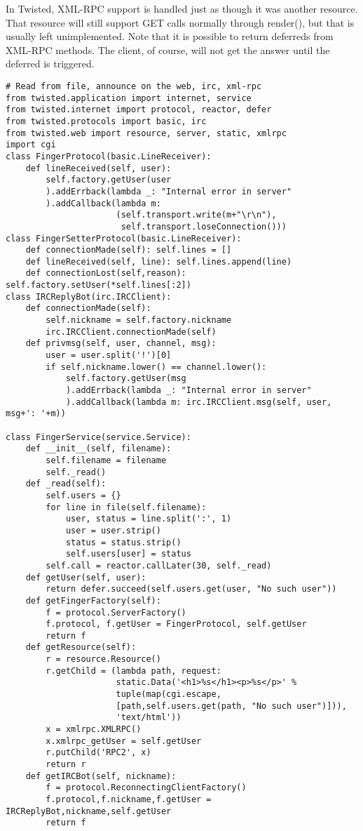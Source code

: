 In Twisted, XML-RPC support is handled just as though it was another resource. That resource will still support GET calls normally through render(), but that is usually left unimplemented. Note that it is possible to return deferreds from XML-RPC methods. The client, of course, will not get the answer until the deferred is triggered.\begin{verbatim}
# Read from file, announce on the web, irc, xml-rpc
from twisted.application import internet, service
from twisted.internet import protocol, reactor, defer
from twisted.protocols import basic, irc
from twisted.web import resource, server, static, xmlrpc
import cgi
class FingerProtocol(basic.LineReceiver):
    def lineReceived(self, user):
        self.factory.getUser(user
        ).addErrback(lambda _: "Internal error in server"
        ).addCallback(lambda m:
                      (self.transport.write(m+"\r\n"),
                       self.transport.loseConnection()))
class FingerSetterProtocol(basic.LineReceiver):
    def connectionMade(self): self.lines = []
    def lineReceived(self, line): self.lines.append(line)
    def connectionLost(self,reason): self.factory.setUser(*self.lines[:2])
class IRCReplyBot(irc.IRCClient):
    def connectionMade(self):
        self.nickname = self.factory.nickname
        irc.IRCClient.connectionMade(self)
    def privmsg(self, user, channel, msg):
        user = user.split('!')[0]
        if self.nickname.lower() == channel.lower():
            self.factory.getUser(msg
            ).addErrback(lambda _: "Internal error in server"
            ).addCallback(lambda m: irc.IRCClient.msg(self, user, msg+': '+m))

class FingerService(service.Service):
    def __init__(self, filename):
        self.filename = filename
        self._read()
    def _read(self):
        self.users = {}
        for line in file(self.filename):
            user, status = line.split(':', 1)
            user = user.strip()
            status = status.strip()
            self.users[user] = status
        self.call = reactor.callLater(30, self._read)
    def getUser(self, user):
        return defer.succeed(self.users.get(user, "No such user"))
    def getFingerFactory(self):
        f = protocol.ServerFactory()
        f.protocol, f.getUser = FingerProtocol, self.getUser
        return f
    def getResource(self):
        r = resource.Resource()
        r.getChild = (lambda path, request:
                      static.Data('<h1>%s</h1><p>%s</p>' %
                      tuple(map(cgi.escape,
                      [path,self.users.get(path, "No such user")])),
                      'text/html'))
        x = xmlrpc.XMLRPC()
        x.xmlrpc_getUser = self.getUser
        r.putChild('RPC2', x)
        return r
    def getIRCBot(self, nickname):
        f = protocol.ReconnectingClientFactory()
        f.protocol,f.nickname,f.getUser = IRCReplyBot,nickname,self.getUser
        return f


\end{verbatim}
